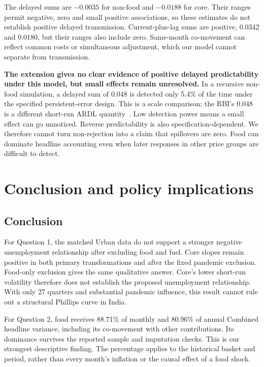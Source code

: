 \documentclass[10pt,a4paper]{article}
\begin{document}
The delayed sums are $-0.0035$ for non-food and $-0.0188$ for core. Their ranges permit negative, zero and small positive associations, so these estimates do not establish positive delayed transmission. Current-plus-lag sums are positive, 0.0342 and 0.0180, but their ranges also include zero. Same-month co-movement can reflect common costs or simultaneous adjustment, which our model cannot separate from transmission.

\textbf{The extension gives no clear evidence of positive delayed predictability under this model, but small effects remain unresolved.} In a recursive non-food simulation, a delayed sum of 0.048 is detected only 5.4\% of the time under the specified persistent-error design. This is a scale comparison; the RBI's 0.048 is a different short-run ARDL quantity~\cite{patra2024}. Low detection power means a small effect can go unnoticed. Reverse predictability is also specification-dependent. We therefore cannot turn non-rejection into a claim that spillovers are zero. Food can dominate headline accounting even when later responses in other price groups are difficult to detect.

\clearpage
\section{Conclusion and policy implications}
\subsection{Conclusion}

For Question 1, the matched Urban data do not support a stronger negative unemployment relationship after excluding food and fuel. Core slopes remain positive in both primary transformations and after the fixed pandemic exclusion. Food-only exclusion gives the same qualitative answer. Core's lower short-run volatility therefore does not establish the proposed unemployment relationship. With only 27 quarters and substantial pandemic influence, this result cannot rule out a structural Phillips curve in India.

For Question 2, food receives 88.71\% of monthly and 80.96\% of annual Combined headline variance, including its co-movement with other contributions. Its dominance survives the reported sample and imputation checks. This is our strongest descriptive finding. The percentage applies to the historical basket and period, rather than every month's inflation or the causal effect of a food shock.
\end{document}
